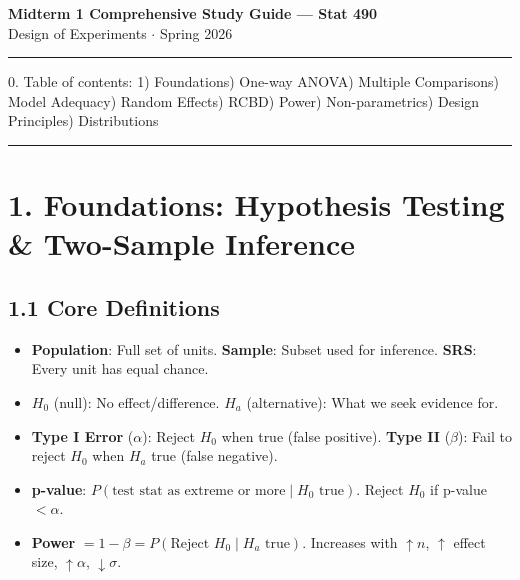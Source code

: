 \documentclass[9pt,letterpaper]{article}
\begin{document}
\begin{center}
{\large \textbf{Midterm 1 Comprehensive Study Guide --- Stat 490}}\\[2pt]
{\small Design of Experiments $\cdot$ Spring 2026}
\end{center}
\vspace{-4pt}\hrule\vspace{4pt}

{\footnotesize 0. Table of contents: 
1) Foundations) One-way ANOVA) Multiple Comparisons) Model Adequacy) Random Effects) RCBD) Power) Non-parametrics) Design Principles) Distributions}
\vspace{2pt}\hrule\vspace{2pt}


\section{1. Foundations: Hypothesis Testing \& Two-Sample Inference}

\subsection{1.1 Core Definitions}
\begin{itemize}
    \item \textbf{Population}: Full set of units. \textbf{Sample}: Subset used for inference. \textbf{SRS}: Every unit has equal chance.
    \item \textbf{$H_0$} (null): No effect/difference. \textbf{$H_a$} (alternative): What we seek evidence for.
    \item \textbf{Type I Error} ($\alpha$): Reject $H_0$ when true (false positive). \textbf{Type II} ($\beta$): Fail to reject $H_0$ when $H_a$ true (false negative).
    \item \textbf{p-value}: $P(\text{test stat as extreme or more} \mid H_0 \text{ true})$. Reject $H_0$ if p-value $< \alpha$.
    \item \textbf{Power} $= 1 - \beta = P(\text{Reject } H_0 \mid H_a \text{ true})$. Increases with $\uparrow n$, $\uparrow$ effect size, $\uparrow \alpha$, $\downarrow \sigma$.
\end{itemize}
\end{document}

